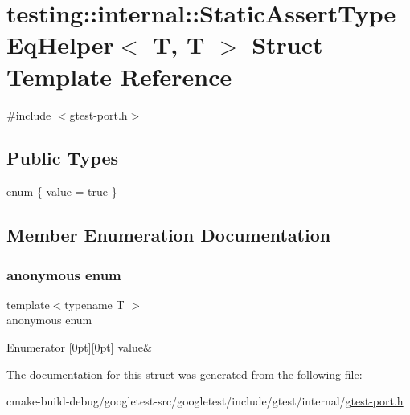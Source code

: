 \hypertarget{structtesting_1_1internal_1_1StaticAssertTypeEqHelper_3_01T_00_01T_01_4}{}\section{testing\+::internal\+::Static\+Assert\+Type\+Eq\+Helper$<$ T, T $>$ Struct Template Reference}
\label{structtesting_1_1internal_1_1StaticAssertTypeEqHelper_3_01T_00_01T_01_4}


{\ttfamily \#include $<$gtest-\/port.\+h$>$}

\subsection*{Public Types}
\begin{DoxyCompactItemize}
\item 
enum \{ \mbox{\hyperlink{structtesting_1_1internal_1_1StaticAssertTypeEqHelper_3_01T_00_01T_01_4_acdb69a9c4164628ea6a80bd6442058c6a63c475f543e4e977d43c5093dd2b7f3f}{value}} = true
 \}
\end{DoxyCompactItemize}


\subsection{Member Enumeration Documentation}
\mbox{\label{structtesting_1_1internal_1_1StaticAssertTypeEqHelper_3_01T_00_01T_01_4_acdb69a9c4164628ea6a80bd6442058c6}} 
\subsubsection{\texorpdfstring{anonymous enum}{anonymous enum}}
{\footnotesize\ttfamily template$<$typename T $>$ \\
anonymous enum}

\begin{DoxyEnumFields}{Enumerator}
[0pt][0pt]{}\mbox{\label{structtesting_1_1internal_1_1StaticAssertTypeEqHelper_3_01T_00_01T_01_4_acdb69a9c4164628ea6a80bd6442058c6a63c475f543e4e977d43c5093dd2b7f3f}} 
value&\\
\hline

\end{DoxyEnumFields}


The documentation for this struct was generated from the following file\+:\begin{DoxyCompactItemize}
\item 
cmake-\/build-\/debug/googletest-\/src/googletest/include/gtest/internal/\mbox{\hyperlink{gtest-port_8h}{gtest-\/port.\+h}}\end{DoxyCompactItemize}
